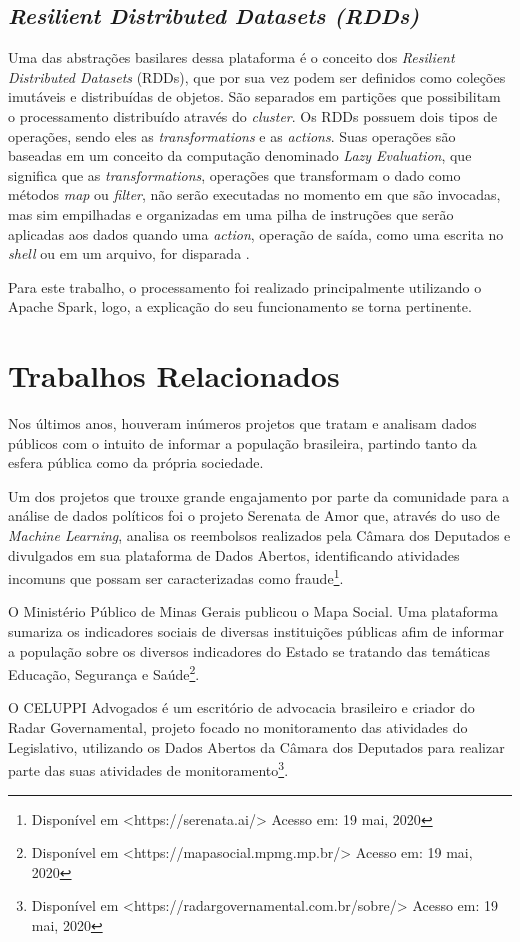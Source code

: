 \subsection{\textit{Resilient Distributed Datasets (RDDs)}}
Uma das abstrações basilares dessa plataforma é o conceito dos \textit{Resilient Distributed Datasets} (RDDs), que por sua vez podem ser definidos como coleções imutáveis e distribuídas de objetos. São separados em partições que possibilitam o processamento distribuído através do \textit{cluster}. Os RDDs possuem dois tipos de operações, sendo eles as \textit{transformations} e as \textit{actions}. Suas operações são baseadas em um conceito da computação denominado \textit{Lazy Evaluation}, que significa que as \textit{transformations}, operações que transformam o dado como métodos \textit{map} ou \textit{filter}, não serão executadas no momento em que são invocadas, mas sim empilhadas e organizadas em uma pilha de instruções que serão aplicadas aos dados quando uma \textit{action}, operação de saída, como uma escrita no \textit{shell} ou em um arquivo, for disparada \cite{learningspark}.

Para este trabalho, o processamento foi realizado principalmente utilizando o Apache Spark, logo, a explicação do seu funcionamento se torna pertinente. 

\section{Trabalhos Relacionados}
\label{Trabalhos Relacionados}
Nos últimos anos, houveram inúmeros projetos que tratam e analisam dados
públicos com o intuito de informar a população brasileira, partindo tanto da esfera pública como da própria sociedade. 

Um dos projetos que trouxe grande engajamento por parte da comunidade para a análise de dados políticos foi o projeto Serenata de Amor que, através do uso de \textit{Machine Learning}, analisa os reembolsos realizados pela Câmara dos Deputados e divulgados em sua plataforma de Dados Abertos, identificando atividades incomuns que possam ser caracterizadas como fraude\footnote{Disponível em <https://serenata.ai/> Acesso em: 19 mai, 2020}. 

O Ministério Público de Minas Gerais publicou o Mapa Social. Uma plataforma sumariza os indicadores sociais de diversas instituições públicas afim de informar a população sobre os diversos indicadores do Estado se tratando das temáticas Educação, Segurança e Saúde\footnote{Disponível em <https://mapasocial.mpmg.mp.br/> Acesso em: 19 mai, 2020}. 

O CELUPPI Advogados é um escritório de advocacia brasileiro e criador do Radar Governamental, projeto focado no monitoramento das atividades do Legislativo, utilizando os Dados Abertos da Câmara dos Deputados para realizar parte das suas atividades de monitoramento\footnote{Disponível em <https://radargovernamental.com.br/sobre/> Acesso em: 19 mai, 2020}.
